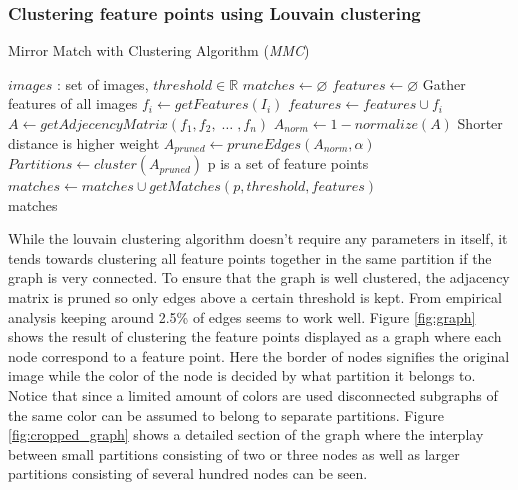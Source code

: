 \documentclass{article}
\begin{document}
\subsubsection{Clustering feature points using Louvain clustering}

\begin{algorithm}
\caption{Mirror Match with Clustering Algorithm (\emph{MMC})}
\label{alg-mmc}
\begin{algorithmic}
\Require $images$ : set of images, $threshold \in \mathbb{R}$
\State $matches\gets \varnothing$
\State $features\gets \varnothing$
 \Comment Gather features of all images
	\State $f_i\gets getFeatures(I_i)$
	\State $features\gets features \cup f_i$
\EndFor
\State $A\gets getAdjecencyMatrix(f_1, f_2,\; \ldots \;, f_n)$
\State $A_{norm}\gets 1 - normalize(A)$
\Comment Shorter distance is higher weight
\State $A_{pruned}\gets pruneEdges(A_{norm},\alpha)$
\State $Partitions\gets cluster(A_{pruned})$
 \Comment p is a set of feature points
	\State $matches\gets matches \cup getMatches(p, threshold, 
features)$
\EndFor \\
\Return matches
\end{algorithmic}
\end{algorithm}

While the louvain clustering algorithm doesn't require any parameters in 
itself, it tends towards clustering all feature points together in the 
same partition if the graph is very connected.  To ensure that the graph 
is well clustered, the adjacency matrix is pruned so only edges above a 
certain threshold is kept. From empirical analysis keeping around 2.5\% 
of edges seems to work well. Figure \ref{fig:graph} shows the result of 
clustering the feature points displayed as a graph where each node 
correspond to a feature point. Here the border of nodes signifies the 
original image while the color of the node is decided by what partition 
it belongs to.  Notice that since a limited amount of colors are used 
disconnected subgraphs of the same color can be assumed to belong to 
separate partitions. Figure \ref{fig:cropped_graph} shows a detailed 
section of the graph where the interplay between small partitions 
consisting of two or three nodes as well as larger partitions consisting 
of several hundred nodes can be seen.
\end{document}
